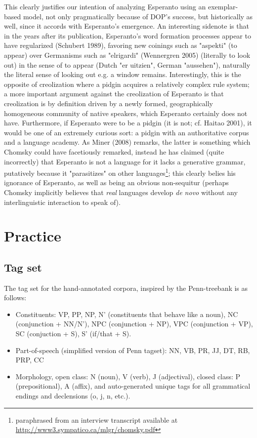 \documentclass[10pt,a4paper]{article}
\begin{document}
This clearly justifies our intention of analyzing Esperanto using an
exemplar-based model, not only pragmatically because of DOP's success, but
historically as well, since it accords with Esperanto's emergence. An
interesting sidenote is that in the years after its publication, Esperanto's
word formation processes appear to have regularized (Schubert 1989), favoring
new coinings such as "aspekti" (to appear) over Germanisms such as "elrigardi"
(Wennergren 2005) (literally to look out) in the sense of to appear (Dutch "er
uitzien", German "aussehen"), naturally the literal sense of looking out e.g.
a window remains.  Interestingly, this is the opposite of creolization where a
pidgin acquires a relatively complex rule system; a more important argument
against the creolization of Esperanto is that creolization is by definition
driven by a newly formed, geographically homogeneous community of native
speakers, which Esperanto certainly does not have. Furthermore, if Esperanto
were to be a pidgin (it is not; cf.  Haitao 2001), it would be one of an
extremely curious sort: a pidgin with an authoritative corpus and a language
academy. As Miner (2008) remarks, the latter is something which Chomsky could
have facetiously remarked, instead he has claimed (quite incorrectly) that
Esperanto is not a language for it lacks a generative grammar, putatively
because it "parasitizes" on other languages\footnote{paraphrased from an
interview transcript available at \url{http://www3.sympatico.ca/mlgr/chomsky.pdf}};
this clearly belies his ignorance of Esperanto, as well as being an obvious
non-sequitur (perhaps Chomsky implicitly believes that {\em real} languages
develop {\em de novo} without any interlinguistic interaction to speak of).

\section{Practice}
\subsection{Tag set}

The tag set for the hand-annotated corpora, inspired by the Penn-treebank is as follows:

\begin{itemize}
\item Constituents: VP, PP, NP, N' (constituents that behave like a noun), 
NC (conjunction + NN/N'), NPC (conjunction + NP), VPC (conjunction + VP), 
SC (conjuction + S), S' (if/that + S). 
\item Part-of-speech (simplified version of Penn tagset): NN, VB, PR, JJ, DT, RB, PRP, CC
\item Morphology, open class: N (noun), V (verb), J (adjectival), 
closed class: P (prepositional), A (affix), and auto-generated unique tags for
all grammatical endings and declensions (o, j, n, etc.).
\end{itemize}
\end{document}
